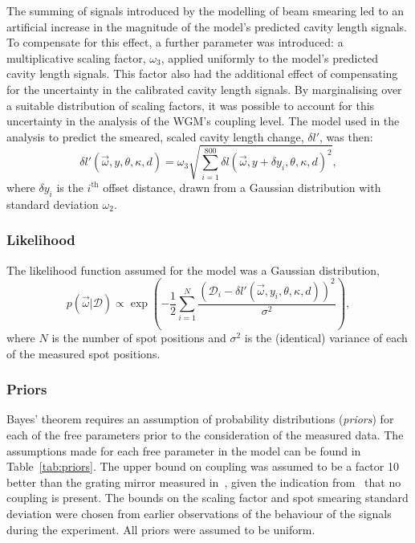 The summing of signals introduced by the modelling of beam smearing led to an artificial increase in the magnitude of the model's predicted cavity length signals. To compensate for this effect, a further parameter was introduced: a multiplicative scaling factor, $\omega_3$, applied uniformly to the model's predicted cavity length signals. This factor also had the additional effect of compensating for the uncertainty in the calibrated cavity length signals. By marginalising over a suitable distribution of scaling factors, it was possible to account for this uncertainty in the analysis of the \gls{WGM}'s coupling level. The model used in the analysis to predict the smeared, scaled cavity length change, $\delta l'$, was then:
\begin{equation}
  \delta l' \left( \vec{\omega}, y, \theta, \kappa, d \right) = \omega_3 \sqrt{\sum_{i=1}^{800} \delta l \left( \vec{\omega}, y + \delta y_i, \theta, \kappa, d \right)^2},
  \label{eq:model}
\end{equation}
where $\delta y_i$ is the $i^\text{th}$ offset distance, drawn from a Gaussian distribution with standard deviation $\omega_2$.

\subsubsection{Likelihood}
The likelihood function assumed for the model was a Gaussian distribution,
\begin{equation}
  p \left( \vec{\omega} | \mathcal{D} \right) \propto \exp \left( -\frac{1}{2} \sum_{i=1}^{N} \frac{\left( \mathcal{D}_i - \delta l' \left( \vec{\omega}, y_i, \theta, \kappa, d \right) \right)^2}{\sigma^2} \right),
  \label{eq:likelihood}
\end{equation}
where $N$ is the number of spot positions and $\sigma^2$ is the (identical) variance of each of the measured spot positions.

\subsubsection{Priors}
Bayes' theorem requires an assumption of probability distributions (\emph{priors}) for each of the free parameters prior to the consideration of the measured data. The assumptions made for each free parameter in the model can be found in Table~\ref{tab:priors}. The upper bound on coupling was assumed to be a factor \num{10} better than the grating mirror measured in~\cite{Barr2011}, given the indication from~\cite{Brown2013} that no coupling is present. The bounds on the scaling factor and spot smearing standard deviation were chosen from earlier observations of the behaviour of the signals during the experiment. All priors were assumed to be uniform.

